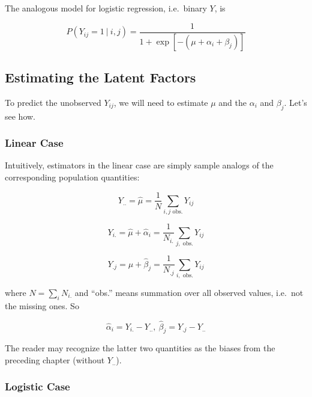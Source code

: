 The analogous model for logistic regression, i.e.\ binary $Y$, is

\begin{equation}
P(Y_{ij} = 1 ~|~ i,j) = 
\frac{1}{1 + \exp[-(\mu + \alpha_i + \beta_j)]}
\end{equation}

\subsection{Estimating the Latent Factors}

To predict the unobserved $Y_{ij}$, we will need to estimate $\mu$ and
the $\alpha_i$ and $\beta_j$.  Let's see how.

\subsubsection{Linear Case}

Intuitively, estimators in the linear case are simply sample analogs of
the corresponding population quantities:

\begin{equation}
Y_{..} = \widehat{\mu} = \frac{1}{N} \sum_{i,j \textrm{ obs.}} Y_{ij}
\end{equation}

\begin{equation}
\label{yi.}
Y_{i.} = \widehat{\mu} + \widehat{\alpha}_i = \frac{1}{N_{i.}}
\sum_{j, \textrm{ obs.}} Y_{ij}
\end{equation}

\begin{equation}
\label{y.j}
Y_{.j} = \widehat{\mu} + \widehat{\beta}_j = \frac{1}{N_{.j}}
\sum_{i, \textrm{ obs.}} Y_{ij}
\end{equation}

where $N = \sum_{i} N_{i.}$ and ``obs.'' means summation over all
observed values, i.e.\ not the missing ones.  So 

\begin{equation}
\widehat{\alpha}_i = Y_{i.}-Y_{..},~ 
\widehat{\beta}_j = Y_{.j}-Y_{..}
\end{equation}

The reader may recognize the latter two quantities as the biases from
the preceding chapter (without $Y_{..}$).

\subsubsection{Logistic Case}


